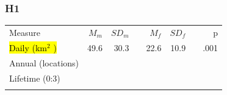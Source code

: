 \documentclass{beamer}
\makeatletter
\newcommand\SoulColor{%
  \let\set@color\beamerorig@set@color
  \let\reset@color\beamerorig@reset@color}
\makeatother
\begin{document}

\begin{frame}
\frametitle{H1}
\begin{table}
\begin{tabular}{lrrrrrrr}
\hline\noalign{\smallskip}
Measure & $M_{m}$ & $SD_{m}$ && $M_{f}$ & $SD_{f}$ && p \\
\noalign{\smallskip}\hline\noalign{\smallskip}
\SoulColor\hl{Daily (km$^{2}$ )} & 49.6 & 30.3 && 22.6 & 10.9 && .001 \\
Annual (locations) &&&&&&&\\
Lifetime (0:3) &&&&&&& \\
\noalign{\smallskip}\hline
\end{tabular}\par
\end{table}		  

\end{frame}

\end{document}
